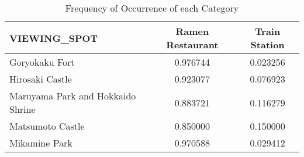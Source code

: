 \begin{table}[h]
\centering
\small
\caption{Frequency of Occurrence of each Category}
\begin{tabular}{lcc}
\toprule
VIEWING\_SPOT                      &  Ramen Restaurant &  Train Station \\
\midrule
                   Goryokaku Fort & 0.976744          & 0.023256       \\
                  Hirosaki Castle & 0.923077          & 0.076923       \\
Maruyama Park and Hokkaido Shrine & 0.883721          & 0.116279       \\
                 Matsumoto Castle & 0.850000          & 0.150000       \\
                    Mikamine Park & 0.970588          & 0.029412       \\
\bottomrule
\end{tabular}
\end{table}
